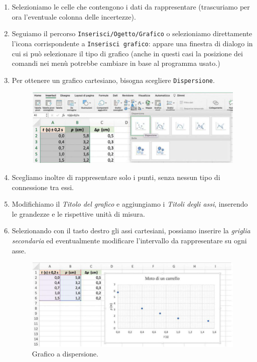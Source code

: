 \documentclass[12pt,a4paper,oneside]{book}
\theoremstyle{esercizio}
\begin{document}
\begin{enumerate}
\item Selezioniamo le celle che contengono i dati da rappresentare
(trascuriamo per ora l'eventuale colonna delle incertezze).
\item Seguiamo il percorso \texttt{Inserisci/Ogetto/Grafico} o selezioniamo
direttamente l'icona corrispondente a \texttt{Inserisci grafico}:
appare una finestra di dialogo in cui si può selezionare il tipo di grafico
(anche in questi casi la posizione dei comandi nei menù potrebbe cambiare in
base al programma usato.)
\item Per ottenere un grafico cartesiano, bisogna scegliere \texttt{Dispersione}.
\begin{figure}[h!]
    \centering
    \includegraphics[scale=0.3]{path_to_image/dispersione-libreoffice.png} 
    \caption{}
    \label{fig:disperslo}
\end{figure}
\item Scegliamo inoltre di rappresentare solo i punti, senza nessun  tipo di connessione
tra essi. 
\item Modifichiamo il \textit{Titolo del grafico} e aggiungiamo i \textit{Titoli degli assi},
inserendo le grandezze e le rispettive unità di misura.
\item Selezionando con il tasto destro gli assi cartesiani, possiamo inserire la
\textit{griglia secondaria}  ed eventualmente modificare l'intervallo da 
rappresentare su ogni asse.
\begin{figure}[h!]
    \centering
    \includegraphics[scale=0.3]{path_to_image/grafico-libreoffice.png} 
    \caption{Grafico a dispersione.}
    \label{fig:puntilibre}
\end{figure}
\end{enumerate}
\end{document}
